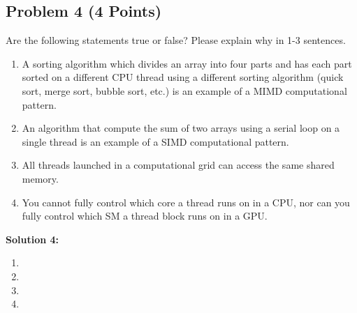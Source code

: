 \documentclass[]{article}
\begin{document}
\subsection*{Problem 4 (4 Points)}
Are the following statements true or false? Please explain why in 1-3 sentences.

\begin{enumerate}
    \item A sorting algorithm which divides an array into four parts and has each part sorted on a different CPU thread using a different sorting algorithm (quick sort, merge sort, bubble sort, etc.) is an example of a MIMD computational pattern.
    \item An algorithm that compute the sum of two arrays using a serial loop on a single thread is an example of a SIMD computational pattern.
    \item All threads launched in a computational grid can access the same shared memory.
    \item You cannot fully control which core a thread runs on in a CPU, nor can you fully control which SM a thread block runs on in a GPU.
\end{enumerate}

\textbf{Solution 4:}
\begin{enumerate}
    \item %
    \item %
    \item %
    \item %
\end{enumerate}
\end{document}

